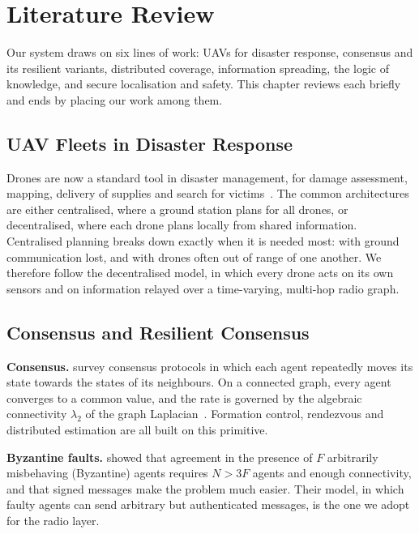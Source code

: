 \chapter[Literature Review]{Literature Review}
\label{cp:literature}

\parindent0pt

Our system draws on six lines of work: UAVs for disaster response, consensus and its resilient variants, distributed
coverage, information spreading, the logic of knowledge, and secure localisation and safety. This chapter reviews each
briefly and ends by placing our work among them.

\section{UAV Fleets in Disaster Response}

Drones are now a standard tool in disaster management, for damage assessment, mapping, delivery of supplies and
search for victims~\citep{Erdelj2017}. The common architectures are either centralised, where a ground station plans
for all drones, or decentralised, where each drone plans locally from shared information. Centralised planning breaks
down exactly when it is needed most: with ground communication lost, and with drones often out of range of one
another. We therefore follow the decentralised model, in which every drone acts on its own sensors and on information
relayed over a time-varying, multi-hop radio graph.

\section{Consensus and Resilient Consensus}
\label{sec:lit-consensus}

\textbf{Consensus.} \citet{OlfatiSaber2007} survey consensus protocols in which each agent repeatedly moves its state
towards the states of its neighbours. On a connected graph, every agent converges to a common value, and the rate is
governed by the algebraic connectivity $\lambda_2$ of the graph Laplacian~\citep{Fiedler1973}. Formation
control, rendezvous and distributed estimation are all built on this primitive.

\textbf{Byzantine faults.} \citet{Lamport1982} showed that agreement in the presence of $F$
arbitrarily misbehaving (Byzantine) agents requires $N > 3F$ agents and enough connectivity, and that signed messages
make the problem much easier. Their model, in which faulty agents can send arbitrary but authenticated messages, is
the one we adopt for the radio layer.

